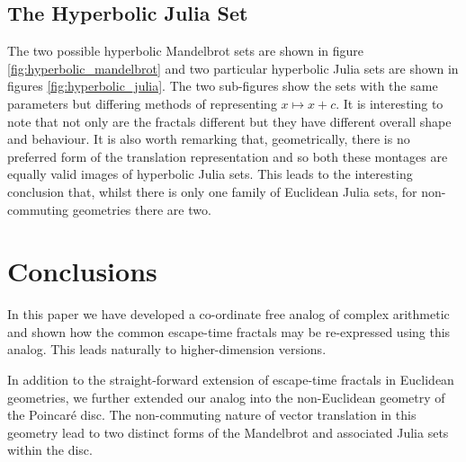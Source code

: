 \documentclass{elsart}
\theoremstyle{definition}
\begin{document}
\subsection{The Hyperbolic Julia Set}

The two possible hyperbolic Mandelbrot sets are shown in figure
\ref{fig:hyperbolic_mandelbrot} and two particular hyperbolic Julia sets are
shown in figures \ref{fig:hyperbolic_julia}.  The two sub-figures show the sets
with the same parameters but differing methods of representing $x \mapsto x+c$.
It is interesting to note that not only are the fractals different but they
have different overall shape and behaviour. It is also worth remarking that,
geometrically, there is no preferred form of the translation representation and
so both these montages are equally valid images of hyperbolic Julia sets.  This
leads to the interesting conclusion that, whilst there is only one family of
Euclidean Julia sets, for non-commuting geometries there are two.

\section{Conclusions}

In this paper we have developed a co-ordinate free analog of complex arithmetic
and shown how the common escape-time fractals may be re-expressed using this
analog. This leads naturally to higher-dimension versions.

In addition to the straight-forward extension of escape-time fractals in
Euclidean geometries, we further extended our analog into the non-Euclidean geometry of the
Poincar\'e disc. The non-commuting nature of vector translation in this
geometry lead to two distinct forms of the Mandelbrot and associated
Julia sets within the disc.


\end{document}
